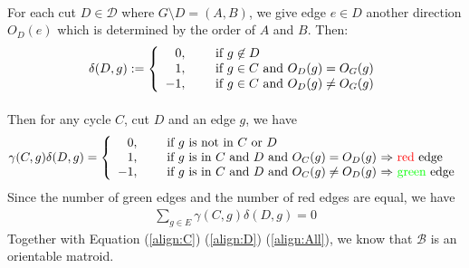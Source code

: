 \documentclass{article}
\begin{document}
\paragraph{}
For each cut $D\in\mathcal{D}$ where $G\setminus D = (A, B)$,
we give edge $e\in D$ another direction $O_D(e)$ which is determined by the order of $A$ and $B$.
Then:
\begin{align}
  \label{align:D}
  \delta(D, g) := \left\{
  \begin{array}{rl}
    0, \hspace{0.5cm} &\mbox{if $g\not\in D$} \\
    1, \hspace{0.5cm} &\mbox{if $g\in C$ and $O_D(g) = O_G(g)$} \\
    -1,\hspace{0.5cm} &\mbox{if $g\in C$ and $O_D(g)\not= O_G(g)$}
  \end{array}
  \right.
\end{align}

\paragraph{}
Then for any cycle $C$, cut $D$ and an edge $g$, we have
\begin{align*}
  \gamma(C, g)\delta(D, g) = \left\{
  \begin{array}{rl}
    0, \hspace{0.5cm} &\mbox{if $g$ is not in $C$ or $D$} \\
    1, \hspace{0.5cm} &\mbox{if $g$ is in $C$ and $D$ and $O_C(g) = O_D(g)$ $\Rightarrow$ \textcolor{red}{red} edge} \\
    -1, \hspace{0.5cm} &\mbox{if $g$ is in $C$ and $D$ and $O_C(g)\not= O_D(g)$ $\Rightarrow$ \textcolor{green}{green} edge}
  \end{array}
  \right.
\end{align*}
Since the number of green edges and the number of red edges are equal, we have
\begin{align}
  \label{align:All}
  \sum_{g\in E} \gamma(C, g)\delta(D, g) = 0
\end{align}
Together with Equation (\ref{align:C}) (\ref{align:D}) (\ref{align:All}), we know that $\mathcal{B}$ is an orientable matroid.
\end{document}
